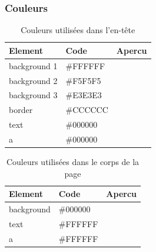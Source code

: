 \documentclass[letter, 11pt]{report}
\begin{document}
\subsubsection{Couleurs}

\begin{table}[htpb]
	\caption{Couleurs utilisées dans l'en-tête}
	\begin{center}
		\begin{tabular}{|l|l|l|}
			\hline
			Element      & Code     & Apercu \\
			\hline
			background 1 & \#FFFFFF & \cellcolor[HTML]{FFFFFF} \\ \hline
			background 2 & \#F5F5F5 & \cellcolor[HTML]{F5F5F5} \\ \hline
			background 3 & \#E3E3E3 & \cellcolor[HTML]{E3E3E3} \\ \hline
			border       & \#CCCCCC & \cellcolor[HTML]{CCCCCC} \\ \hline
			text         & \#000000 & \cellcolor[HTML]{000000} \\ \hline
			a            & \#000000 & \cellcolor[HTML]{000000} \\ \hline
		\end{tabular}
	\end{center}
\end{table}

\begin{table}[htpb]
	\caption{Couleurs utilisées dans le corps de la page}
	\begin{center}
		\begin{tabular}{|l|l|l|}
			\hline
			Element    & Code     & Apercu \\
			\hline
			background & \#000000 & \cellcolor[HTML]{000000} \\ \hline
			text       & \#FFFFFF & \cellcolor[HTML]{FFFFFF} \\ \hline
			a          & \#FFFFFF & \cellcolor[HTML]{FFFFFF} \\ \hline
		\end{tabular}
	\end{center}
\end{table}
\end{document}
